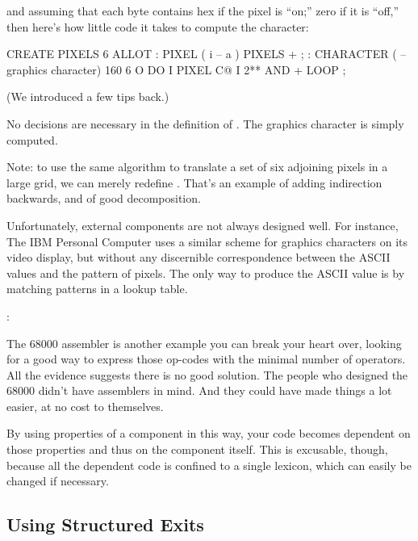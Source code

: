 \noindent and assuming that each byte contains hex  if the pixel is
``on;'' zero if it is ``off,'' then here's how little code it takes to
compute the character:

\begin{Code}
CREATE PIXELS  6 ALLOT
: PIXEL  ( i -- a )  PIXELS + ;
: CHARACTER  ( -- graphics character)
   160   6 O DO  I PIXEL C@  I 2** AND  +  LOOP ;
\end{Code}
(We introduced  a few tips back.)

No decisions are necessary in the definition of . The
graphics character is simply computed.

Note: to use the same algorithm to translate a set of six adjoining
pixels in a large grid, we can merely redefine . That's an example
of adding indirection backwards, and of good decomposition.

Unfortunately, external components are not always designed well.
For instance, The IBM Personal Computer uses a similar scheme for
graphics characters on its video display, but without any discernible
correspondence between the ASCII values and the pattern of pixels. The
only way to produce the ASCII value is by matching patterns in a lookup
table.

\begin{interview}
:
\begin{tfquot}
The 68000 assembler is another example you can break your heart over,
looking for a good way to express those op-codes with the minimal number
of operators. All the evidence suggests there is no good solution. The people
who designed the 68000 didn't have assemblers in mind. And they could
have made things a lot easier, at no cost to themselves.
\end{tfquot}
\end{interview}
By using properties of a component in this way, your code becomes
dependent on those properties and thus on the component itself. This is
excusable, though, because all the dependent code is confined to a single
lexicon, which can easily be changed if necessary.%

\subsection{Using Structured Exits}%

